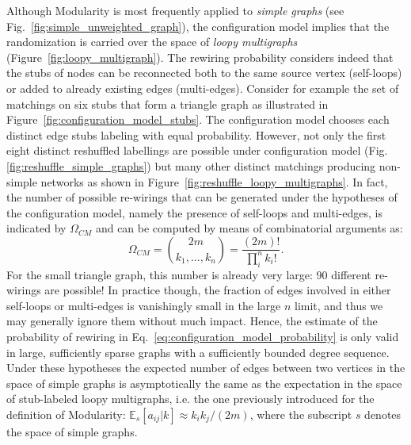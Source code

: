 Although Modularity is most frequently applied to \emph{simple graphs} (see Fig.~\ref{fig:simple_unweighted_graph}), the configuration model implies that the randomization is carried over the space of \emph{loopy multigraphs} (Figure~\ref{fig:loopy_multigraph}).
The rewiring probability considers indeed that the stubs of nodes can be reconnected both to the same source vertex (self-loops) or added to already existing edges (multi-edges).
Consider for example the set of matchings on six stubs that form a triangle graph as illustrated in Figure~\ref{fig:configuration_model_stubs}. The configuration model chooses each distinct edge stubs labeling with equal probability. However, not only the first eight distinct reshuffled labellings are possible under configuration model (Fig.\ref{fig:reshuffle_simple_graphs}) but many other distinct matchings producing non-simple networks as shown in Figure~\ref{fig:reshuffle_loopy_multigraphs}.
In fact, the number of possible re-wirings that can be generated under the hypotheses of the configuration model, namely the presence of self-loops and multi-edges, is indicated by $\Omega_{CM}$ and can be computed by means of combinatorial arguments as:
\begin{equation}\label{eq:cm_possible_rewirings}
\Omega_{CM} = \binom{2m}{k_1,\ldots,k_n} = \frac{(2m)!}{\prod_i^n k_i!}.
\end{equation}
For the small triangle graph, this number is already very large: 90 different re-wirings are possible!
In practice though, the fraction of edges involved in either self-loops or multi-edges is vanishingly small in the large $n$ limit, and thus we may generally ignore them without much impact. 
Hence, the estimate of the probability of rewiring in Eq.~\ref{eq:configuration_model_probability} is only valid in large, sufficiently sparse graphs with a sufficiently bounded degree sequence.
Under these hypotheses the expected number of edges between two vertices in the space of simple graphs is asymptotically the same as the expectation in the space of stub-labeled loopy multigraphs, i.e. the one previously introduced for the definition of Modularity: $\mathbb{E}_s[a_{ij} |k] \approx k_i k_j /(2m)$, where the subscript $s$ denotes the space of simple graphs.

